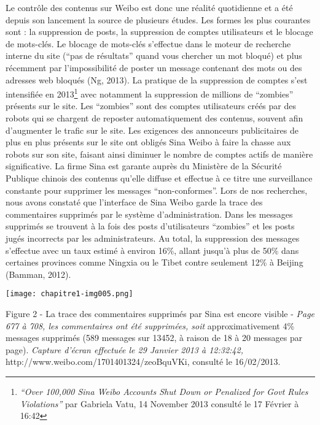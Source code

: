 {\color{black}
Le contr\^ole des contenus sur Weibo est donc une r\'ealit\'e quotidienne et a \'et\'e depuis son lancement la source de
plusieurs \'etudes. Les formes les plus courantes sont : la suppression de posts, la suppression de comptes
utilisateurs et le blocage de mots-cl\'es. Le blocage de mots-cl\'es s'effectue dans le moteur de recherche interne du
site (``pas de r\'esultats'' quand vous chercher un mot bloqu\'e) et plus r\'ecemment par l'impossibilit\'e de poster
un message contenant des mots ou des adresses web bloqu\'es (Ng, 2013). La pratique de la suppression de comptes s'est
intensifi\'ee en 2013\footnote{\textit{{}``}\textit{Over 100,000 Sina Weibo Accounts Shut Down or Penalized for Govt
Rules Violations''} par Gabriela Vatu, 14 November 2013
\href{http://news.softpedia.com/news/Over-100-000-Sina-Weibo-Accounts-Shut-Down-or-Penalized-for-Govt-Rules-Violations-400289.shtml,}{}
consult\'e le 17 F\'evrier \`a 16:42} avec notamment la suppression de millions de ``zombies'' pr\'esents sur le site.
Les {}``zombies'' sont des comptes utilisateurs cr\'e\'es par des robots qui se chargent de reposter automatiquement
des contenus, souvent afin d'augmenter le trafic sur le site. Les exigences des annonceurs publicitaires de plus en
plus pr\'esents sur le site ont oblig\'es Sina Weibo \`a faire la chasse aux robots sur son site, faisant ainsi
diminuer le nombre de comptes actifs de mani\`ere significative. La firme Sina est garante aupr\`es du Minist\`ere de
la S\'ecurit\'e Publique chinois des contenus qu'elle diffuse et effectue \`a ce titre une surveillance constante pour
supprimer les messages ``non-conformes''. Lors de nos recherches, nous avons constat\'e que l'interface de Sina Weibo
garde la trace des commentaires supprim\'es par le syst\`eme d'administration. Dans les messages supprim\'es se
trouvent \`a la fois des posts d'utilisateurs ``zombies'' et les posts jug\'es incorrects par les administrateurs. Au
total, la suppression des messages s'effectue avec un taux estim\'e \`a environ 16\%, allant jusqu'\`a plus de 50\%
dans certaines provinces comme Ningxia ou le Tibet contre seulement 12\% \`a Beijing (Bamman, 2012).}


\bigskip



\begin{center}
\texttt{[image: chapitre1-img005.png]}
\end{center}
{\color{black}
Figure 2 - La trace des commentaires supprim\'es par Sina est encore visible - \textit{Page 677 \`a 708, les
commentaires ont \'et\'e supprim\'ees, soit }approximativement 4\% messages supprim\'es (589 messages sur 13452, \`a
raison de 18 \`a 20 messages par page). \textit{Capture d'\'ecran effectu\'ee le 29 Janvier 2013 \`a 12:32:42,
}http://www.weibo.com/1701401324/zeoBquVKi,\textcolor[rgb]{0.0,0.5019608,0.5019608}{ }consult\'e le 16/02/2013.}


